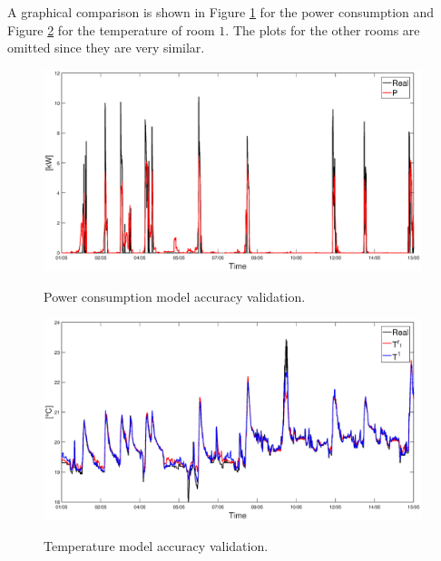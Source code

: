 A graphical comparison is shown in Figure \ref{F:power_testing} for the power consumption and Figure \ref{F:temperature_testing} for the temperature of room $1$. The plots for the other rooms are omitted since they are very similar.

\begin{figure}[h!]
\begin{center}
	\includegraphics[width=26pc]{figures/power_testing.eps}
	\caption{Power consumption model accuracy validation.}
	\captionsetup{justification=centering}
	\label{F:power_testing}
\end{center}
\end{figure}

\begin{figure}[h!]
\begin{center}
	\includegraphics[width=26pc]{figures/temperature_testing.eps}
	\caption{Temperature model accuracy validation.}
	\captionsetup{justification=centering}
	\label{F:temperature_testing}
\end{center}
\end{figure}

